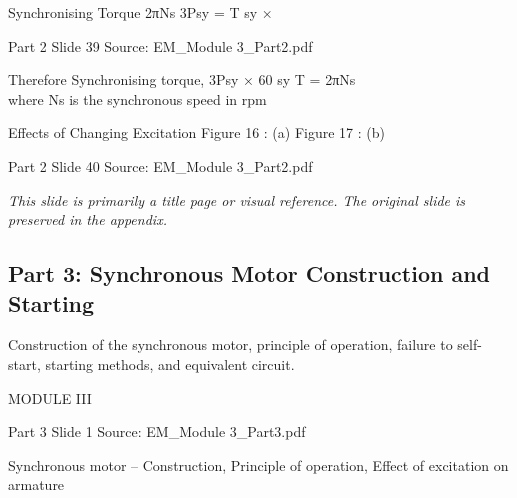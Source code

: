 \documentclass[11pt,a4paper]{article}
\begin{document}
\begin{mdframed}[roundcorner=9pt,backgroundcolor=white,linecolor=anthBlue,linewidth=1pt,innerleftmargin=12pt,innerrightmargin=12pt,innertopmargin=10pt,innerbottommargin=10pt,skipabove=8pt,skipbelow=10pt]
{\HeadingFont\fontsize{15}{18}\selectfont\color{anthDark}Synchronising Torque 2πNs 3Psy = T sy ×\par}
{\color{anthMid}\small Part 2 \textbullet{} Slide 39 \textbullet{} Source: EM\_Module 3\_Part2.pdf\par}
\vspace{0.5em}
{\small
\smallskip
Therefore Synchronising torque, 3Psy × 60 sy   T       = 2πNs\\
\smallskip
where Ns is the synchronous speed in rpm\\

}
\end{mdframed}

\begin{mdframed}[roundcorner=9pt,backgroundcolor=white,linecolor=anthGreen,linewidth=1pt,innerleftmargin=12pt,innerrightmargin=12pt,innertopmargin=10pt,innerbottommargin=10pt,skipabove=8pt,skipbelow=10pt]
{\HeadingFont\fontsize{15}{18}\selectfont\color{anthDark}Effects of Changing Excitation Figure 16 : (a)             Figure 17 : (b)\par}
{\color{anthMid}\small Part 2 \textbullet{} Slide 40 \textbullet{} Source: EM\_Module 3\_Part2.pdf\par}
\vspace{0.5em}
{\small
\textit{This slide is primarily a title page or visual reference. The original slide is preserved in the appendix.}

}
\end{mdframed}

\subsection{Part 3: Synchronous Motor Construction and Starting}
Construction of the synchronous motor, principle of operation, failure to self-start, starting methods, and equivalent circuit.

\begin{mdframed}[roundcorner=9pt,backgroundcolor=white,linecolor=anthOrange,linewidth=1pt,innerleftmargin=12pt,innerrightmargin=12pt,innertopmargin=10pt,innerbottommargin=10pt,skipabove=8pt,skipbelow=10pt]
{\HeadingFont\fontsize{15}{18}\selectfont\color{anthDark}MODULE III\par}
{\color{anthMid}\small Part 3 \textbullet{} Slide 1 \textbullet{} Source: EM\_Module 3\_Part3.pdf\par}
\vspace{0.5em}
{\small
Synchronous motor – Construction, Principle of operation, Effect of excitation on armature\\

}
\end{mdframed}
\end{document}
